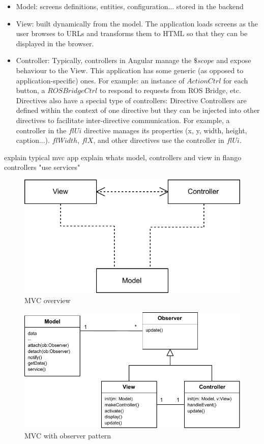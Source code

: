 \begin{itemize}
    \item Model: screens definitions, entities, configuration... stored in the backend
    \item View: built dynamically from the model. The application loads screens as the user browses to \ac{URL}s and transforms them to \ac{HTML} so that they can be displayed in the browser.
    \item Controller: Typically, controllers in Angular manage the $\$scope$ and expose behaviour to the View. This application has some generic (as opposed to application-specific) ones. For example: an instance of $ActionCtrl$ for each button, a $ROSBridgeCtrl$ to respond to requests from ROS Bridge, etc. Directives also have a special type of controllers: Directive Controllers are defined within the context of one directive but they can be injected into other directives to facilitate inter-directive communication. For example, a controller in the $flUi$ directive manages its properties (x, y, width, height, caption...). $flWidth$, $flX$, and other directives use the controller in $flUi$.
\end{itemize}


explain typical mvc app
explain whats model, controllers and view in flango
controllers "use services" 

\begin{figure}[htb]
    \centering
    \includegraphics{figures/design-patterns-mvc-1.pdf}
    \caption{MVC overview}
    \label{fig:mvc-overview}
\end{figure}

\begin{figure}[htb]
    \centering
    \includegraphics{figures/design-patterns-mvc-2.pdf}
    \caption{MVC with observer pattern}
    \label{fig:mvc-with-observer}
\end{figure}

